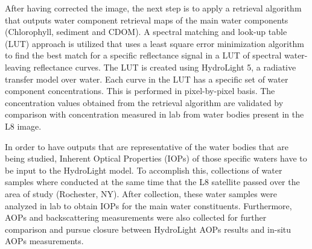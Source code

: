 After having corrected the image, the next step is to apply a retrieval algorithm that outputs water component retrieval maps of the main water components (Chlorophyll, sediment and CDOM). A spectral matching and look-up table (LUT) approach is utilized that uses a least square error minimization algorithm to find the best match for a specific reflectance signal in a LUT of spectral water-leaving reflectance curves. The LUT is created using HydroLight 5, a radiative transfer model over water. Each curve in the LUT has a specific set of water component concentrations. This is performed in pixel-by-pixel basis. The concentration values obtained from the retrieval algorithm are validated by comparison with concentration measured in lab from water bodies present in the L8 image.

In order to have outputs that are representative of the water bodies that are being studied, Inherent Optical Properties (IOPs) of those specific waters have to be input to the HydroLight model. To accomplish this, collections of water samples where conducted at the same time that the L8 satellite passed over the area of study (Rochester, NY). After collection, these water samples were analyzed in lab to obtain IOPs for the main water constituents. Furthermore, AOPs and backscattering measurements were also collected for further comparison and pursue closure between HydroLight AOPs results and in-situ AOPs measurements.

